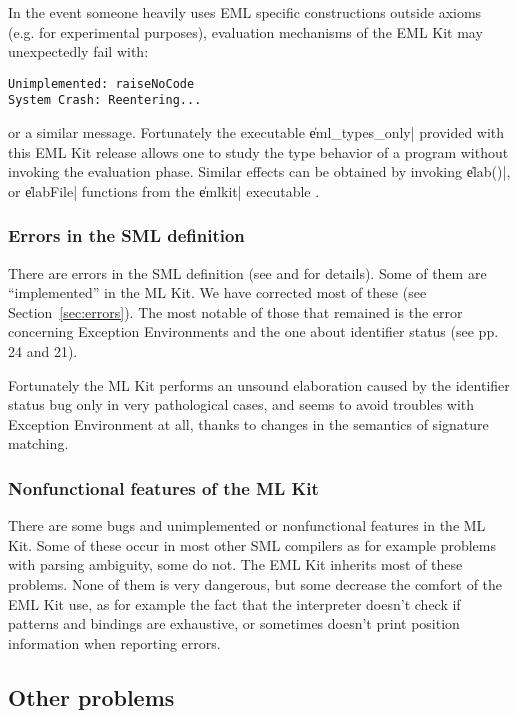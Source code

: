 In the event someone heavily 
uses EML specific constructions outside axioms 
(e.g. for experimental purposes), evaluation 
mechanisms of the EML Kit may unexpectedly fail with:
\begin{verbatim}
Unimplemented: raiseNoCode
System Crash: Reentering...
\end{verbatim} 
or a similar message.
Fortunately the executable \|eml_types_only| 
provided with this EML Kit release
allows one to study the type behavior 
of a program without invoking the evaluation phase.
Similar effects can be obtained by invoking \|elab()|, 
or \|elabFile| functions from the \|emlkit| executable .

\subsubsection{Errors in the SML definition}
\label{sec:state_errors}

There are errors in the SML definition 
(see \cite{Kah93} and \cite{Kah95} for details).
Some of them are ``implemented'' in the ML Kit.
We have corrected most of these (see Section~\ref{sec:errors}).
The most notable of those that remained is
the error concerning Exception Environments and
the one about identifier status 
(see \cite{Kah93} pp. 24 and 21). 

Fortunately the ML Kit performs an unsound elaboration
caused by the identifier status bug only in very pathological cases,
and seems to avoid troubles with Exception Environment at all,
thanks to changes in the semantics of signature matching.

\subsubsection{Nonfunctional features of the ML Kit}
\label{sec:nonfunctional}

There are some bugs and unimplemented or nonfunctional features
in the ML Kit. Some of these occur in most other SML compilers
as for example problems with parsing ambiguity, some do not. 
The EML Kit inherits most of these problems. 
None of them is very dangerous, but some decrease 
the comfort of the EML Kit use, as for example the fact that the interpreter
doesn't check if patterns and bindings are exhaustive,
or sometimes doesn't print position information when reporting errors.

\subsection{Other problems}

